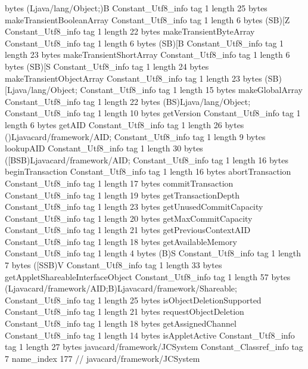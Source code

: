 {{{			bytes	(Ljava/lang/Object;)B
		}
		Constant_Utf8_info {
			tag	1
			length	25
			bytes	makeTransientBooleanArray
		}
		Constant_Utf8_info {
			tag	1
			length	6
			bytes	(SB)[Z
		}
		Constant_Utf8_info {
			tag	1
			length	22
			bytes	makeTransientByteArray
		}
		Constant_Utf8_info {
			tag	1
			length	6
			bytes	(SB)[B
		}
		Constant_Utf8_info {
			tag	1
			length	23
			bytes	makeTransientShortArray
		}
		Constant_Utf8_info {
			tag	1
			length	6
			bytes	(SB)[S
		}
		Constant_Utf8_info {
			tag	1
			length	24
			bytes	makeTransientObjectArray
		}
		Constant_Utf8_info {
			tag	1
			length	23
			bytes	(SB)[Ljava/lang/Object;
		}
		Constant_Utf8_info {
			tag	1
			length	15
			bytes	makeGlobalArray
		}
		Constant_Utf8_info {
			tag	1
			length	22
			bytes	(BS)Ljava/lang/Object;
		}
		Constant_Utf8_info {
			tag	1
			length	10
			bytes	getVersion
		}
		Constant_Utf8_info {
			tag	1
			length	6
			bytes	getAID
		}
		Constant_Utf8_info {
			tag	1
			length	26
			bytes	()Ljavacard/framework/AID;
		}
		Constant_Utf8_info {
			tag	1
			length	9
			bytes	lookupAID
		}
		Constant_Utf8_info {
			tag	1
			length	30
			bytes	([BSB)Ljavacard/framework/AID;
		}
		Constant_Utf8_info {
			tag	1
			length	16
			bytes	beginTransaction
		}
		Constant_Utf8_info {
			tag	1
			length	16
			bytes	abortTransaction
		}
		Constant_Utf8_info {
			tag	1
			length	17
			bytes	commitTransaction
		}
		Constant_Utf8_info {
			tag	1
			length	19
			bytes	getTransactionDepth
		}
		Constant_Utf8_info {
			tag	1
			length	23
			bytes	getUnusedCommitCapacity
		}
		Constant_Utf8_info {
			tag	1
			length	20
			bytes	getMaxCommitCapacity
		}
		Constant_Utf8_info {
			tag	1
			length	21
			bytes	getPreviousContextAID
		}
		Constant_Utf8_info {
			tag	1
			length	18
			bytes	getAvailableMemory
		}
		Constant_Utf8_info {
			tag	1
			length	4
			bytes	(B)S
		}
		Constant_Utf8_info {
			tag	1
			length	7
			bytes	([SSB)V
		}
		Constant_Utf8_info {
			tag	1
			length	33
			bytes	getAppletShareableInterfaceObject
		}
		Constant_Utf8_info {
			tag	1
			length	57
			bytes	(Ljavacard/framework/AID;B)Ljavacard/framework/Shareable;
		}
		Constant_Utf8_info {
			tag	1
			length	25
			bytes	isObjectDeletionSupported
		}
		Constant_Utf8_info {
			tag	1
			length	21
			bytes	requestObjectDeletion
		}
		Constant_Utf8_info {
			tag	1
			length	18
			bytes	getAssignedChannel
		}
		Constant_Utf8_info {
			tag	1
			length	14
			bytes	isAppletActive
		}
		Constant_Utf8_info {
			tag	1
			length	27
			bytes	javacard/framework/JCSystem
		}
		Constant_Classref_info {
			tag	7
			name_index	177		// javacard/framework/JCSystem
}}}
